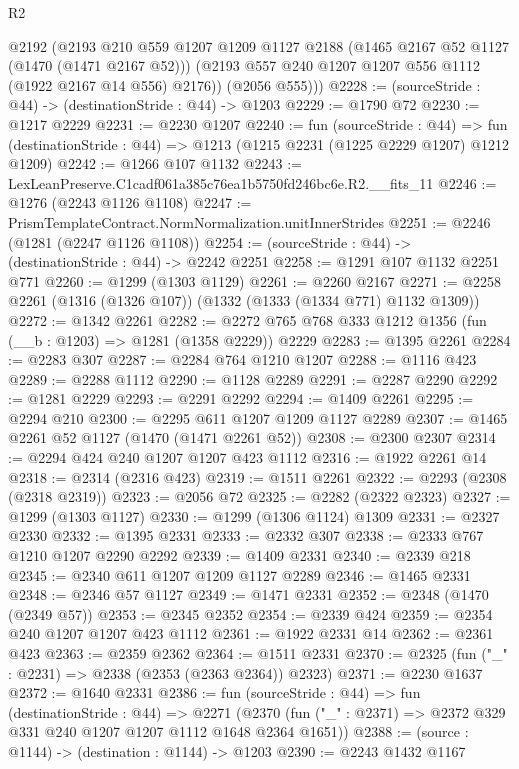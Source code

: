 \begin{lexlean}{R2}
\begin{coremodule}
      @2192
        (@2193
          @210
          @559
          @1207
          @1209
          @1127
          @2188
          (@1465 @2167 @52 @1127 (@1470 (@1471 @2167 @52)))
          (@2193 @557 @240 @1207 @1207 @556 @1112 (@1922 @2167 @14 @556) @2176))
        (@2056 @555)))
@2228 := (sourceStride : @44) -> (destinationStride : @44) -> @1203
@2229 := @1790 @72
@2230 := @1217 @2229
@2231 := @2230 @1207
@2240 := fun (sourceStride : @44) =>
  fun (destinationStride : @44) => @1213 (@1215 @2231 (@1225 @2229 @1207) @1212 @1209)
@2242 := @1266 @107 @1132
@2243 := LexLeanPreserve.C1cadf061a385c76ea1b5750fd246bc6e.R2.__fits_11
@2246 := @1276 (@2243 @1126 @1108)
@2247 := PrismTemplateContract.NormNormalization.unitInnerStrides
@2251 := @2246 (@1281 (@2247 @1126 @1108))
@2254 := (sourceStride : @44) -> (destinationStride : @44) -> @2242 @2251
@2258 := @1291 @107 @1132 @2251 @771
@2260 := @1299 (@1303 @1129)
@2261 := @2260 @2167
@2271 := @2258 @2261 (@1316 (@1326 @107)) (@1332 (@1333 (@1334 @771) @1132 @1309))
@2272 := @1342 @2261
@2282 := @2272 @765 @768 @333 @1212 @1356 (fun (__b : @1203) => @1281 (@1358 @2229)) @2229
@2283 := @1395 @2261
@2284 := @2283 @307
@2287 := @2284 @764 @1210 @1207
@2288 := @1116 @423
@2289 := @2288 @1112
@2290 := @1128 @2289
@2291 := @2287 @2290
@2292 := @1281 @2229
@2293 := @2291 @2292
@2294 := @1409 @2261
@2295 := @2294 @210
@2300 := @2295 @611 @1207 @1209 @1127 @2289
@2307 := @1465 @2261 @52 @1127 (@1470 (@1471 @2261 @52))
@2308 := @2300 @2307
@2314 := @2294 @424 @240 @1207 @1207 @423 @1112
@2316 := @1922 @2261 @14
@2318 := @2314 (@2316 @423)
@2319 := @1511 @2261
@2322 := @2293 (@2308 (@2318 @2319))
@2323 := @2056 @72
@2325 := @2282 (@2322 @2323)
@2327 := @1299 (@1303 @1127)
@2330 := @1299 (@1306 @1124) @1309
@2331 := @2327 @2330
@2332 := @1395 @2331
@2333 := @2332 @307
@2338 := @2333 @767 @1210 @1207 @2290 @2292
@2339 := @1409 @2331
@2340 := @2339 @218
@2345 := @2340 @611 @1207 @1209 @1127 @2289
@2346 := @1465 @2331
@2348 := @2346 @57 @1127
@2349 := @1471 @2331
@2352 := @2348 (@1470 (@2349 @57))
@2353 := @2345 @2352
@2354 := @2339 @424
@2359 := @2354 @240 @1207 @1207 @423 @1112
@2361 := @1922 @2331 @14
@2362 := @2361 @423
@2363 := @2359 @2362
@2364 := @1511 @2331
@2370 := @2325 (fun ("_" : @2231) => @2338 (@2353 (@2363 @2364)) @2323)
@2371 := @2230 @1637
@2372 := @1640 @2331
@2386 := fun (sourceStride : @44) =>
  fun (destinationStride : @44) =>
  @2271 (@2370 (fun ("_" : @2371) => @2372 @329 @331 @240 @1207 @1207 @1112 @1648 @2364 @1651))
@2388 := (source : @1144) -> (destination : @1144) -> @1203
@2390 := @2243 @1432 @1167

\end{coremodule}
\end{lexlean}
